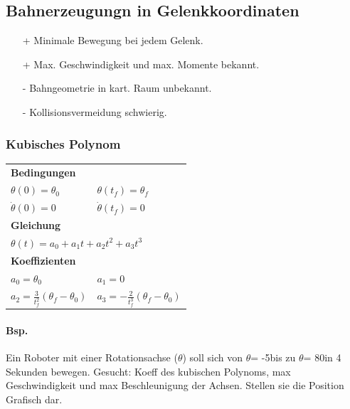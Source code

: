\subsection{Bahnerzeugungn in Gelenkkoordinaten}
\begin{multicols}{2}
    \begin{itemize}
        \item[+] Minimale Bewegung bei jedem Gelenk.
        \item[+] Max. Geschwindigkeit und max. Momente bekannt.
    \end{itemize}

    \begin{itemize}
        \item[-] Bahngeometrie in kart. Raum unbekannt.
        \item[-] Kollisionsvermeidung schwierig.
    \end{itemize}
\end{multicols}
\clearpage
\subsubsection{Kubisches Polynom}
\begin{tabular}{ll}
\multicolumn{2}{l}{\textbf{Bedingungen}}\\
$ \theta(0)=\theta_0 $& $ \theta(t_f) = \theta_f$\\ 
$ \dot{\theta}(0)=0 $& $ \dot{\theta}(t_f) = 0$\\
\multicolumn{2}{l}{\textbf{Gleichung}}\\
\multicolumn{2}{l}{$ \theta(t)=a_0 + a_1t + a_2t^2+a_3t^3$}\\
\multicolumn{2}{l}{\textbf{Koeffizienten}}\\
$a_0= \theta_0$&$a_1=0 $\\
$a_2 = \frac{3}{t_f^2}(\theta_f - \theta_0) $&$a_3=-\frac{2}{t_f^3}(\theta_f-\theta_0) $\\
\end{tabular}
\paragraph{Bsp.}
Ein Roboter mit einer Rotationsachse ($\theta$) soll sich von $\theta$= -5\textdegree bis zu $\theta$= 80\textdegree in 4 Sekunden bewegen.\newline
Gesucht: Koeff des kubischen Polynoms, max Geschwindigkeit und max Beschleunigung der Achsen.
Stellen sie die Position Grafisch dar.

